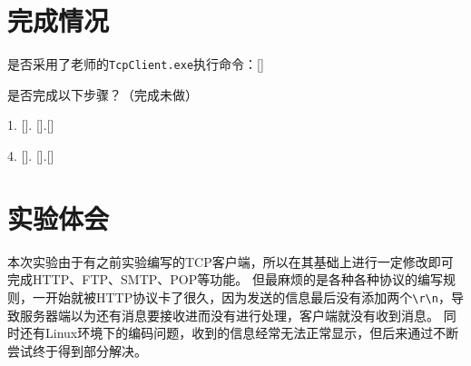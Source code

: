 \documentclass[logo,reportComp]{thesis}
\begin{document}
\section{完成情况}
是否采用了老师的\verb'TcpClient.exe'执行命令：[\xmark]

是否完成以下步骤？（\cmark 完成\quad\xmark 未做）
\par 1. [\cmark]. [\cmark].[\cmark]
\par 4. [\cmark]. [\cmark].[\cmark]

\section{实验体会}

本次实验由于有之前实验编写的TCP客户端，所以在其基础上进行一定修改即可完成HTTP、FTP、SMTP、POP等功能。
但最麻烦的是各种各种协议的编写规则，一开始就被HTTP协议卡了很久，因为发送的信息最后没有添加两个\verb'\r\n'，导致服务器端以为还有消息要接收进而没有进行处理，客户端就没有收到消息。
同时还有Linux环境下的编码问题，收到的信息经常无法正常显示，但后来通过不断尝试终于得到部分解决。
\end{document}
